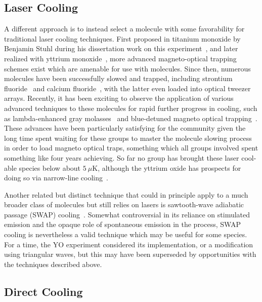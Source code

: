 \subsection{Laser Cooling}

A different approach is to instead select a molecule with some favorability for traditional laser cooling techniques.
First proposed in titanium monoxide by Benjamin Stuhl during his dissertation work on this experiment~\cite{Stuhl2008}, and later realized with yttrium monoxide~\cite{Collopy2018}, more advanced magneto-optical trapping schemes exist which are amenable for use with molecules.
Since then, numerous molecules have been successfully slowed and trapped, including strontium fluoride~\cite{Steinecker2016} and calcium fluoride~\cite{Anderegg2019}, with the latter even loaded into optical tweezer arrays.
Recently, it has been exciting to observe the application of various advanced techniques to these molecules for rapid further progress in cooling, such as lambda-enhanced gray molasses~\cite{Anderegg2018} and blue-detuned magneto optical trapping~\cite{Jarvis2018}.
These advances have been particularly satisfying for the community given the long time spent waiting for these groups to master the molecule slowing process in order to load magneto optical traps, something which all groups involved spent something like four years achieving.
So far no group has brought these laser cool-able species below about $5~\mu$K, although the yttrium oxide has prospects for doing so via narrow-line cooling~\cite{Collopy2015}.

Another related but distinct technique that could in principle apply to a much broader class of molecules but still relies on lasers is sawtooth-wave adiabatic passage (SWAP) cooling~\cite{Bartolotta2018}.
Somewhat controversial in its reliance on stimulated emission and the opaque role of spontaneous emission in the process, SWAP cooling is nevertheless a valid technique which may be useful for some species.
For a time, the YO experiment considered its implementation, or a modification using triangular waves, but this may have been superseded by opportunities with the techniques described above.

\subsection{Direct Cooling}

